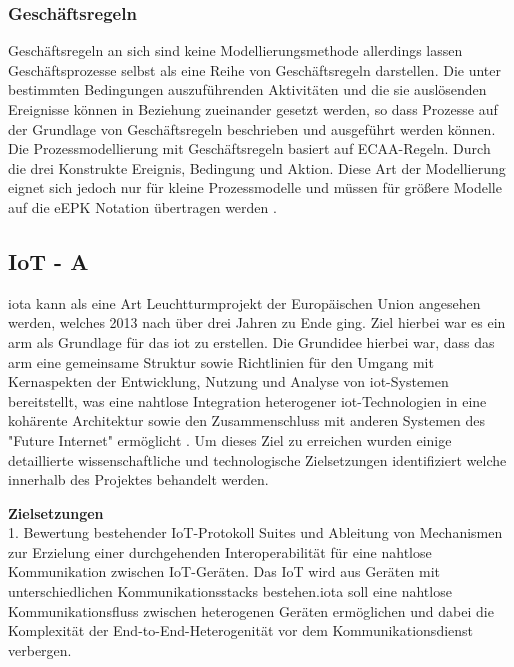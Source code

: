 \documentclass[a4paper, 12pt, twoside, headsepline=true]{scrartcl} %
\begin{document}
\subsubsection{Geschäftsregeln}

Geschäftsregeln an sich sind keine Modellierungsmethode allerdings lassen Geschäftsprozesse selbst als eine Reihe von Geschäftsregeln darstellen. Die unter bestimmten Bedingungen auszuführenden Aktivitäten und die sie auslösenden Ereignisse können in Beziehung zueinander gesetzt werden, so dass Prozesse auf der Grundlage von Geschäftsregeln beschrieben und ausgeführt werden können. Die Prozessmodellierung mit Geschäftsregeln basiert auf ECAA-Regeln. Durch die drei Konstrukte Ereignis, Bedingung und Aktion. Diese Art der Modellierung eignet sich jedoch nur für kleine Prozessmodelle und müssen für größere Modelle auf die \ac{eEPK} Notation übertragen werden \cite{businessrules}.

\subsection{IoT - A}

\acl{iota} kann als eine Art Leuchtturmprojekt der Europäischen Union angesehen werden, welches 2013 nach über drei Jahren zu Ende ging. Ziel hierbei war es ein \ac{arm} als Grundlage für das \ac{iot} zu erstellen. Die Grundidee hierbei war, dass das \ac{arm} eine gemeinsame Struktur sowie Richtlinien für den Umgang mit Kernaspekten der Entwicklung, Nutzung und Analyse von \ac{iot}-Systemen bereitstellt, was eine nahtlose Integration heterogener \ac{iot}-Technologien in eine kohärente Architektur sowie den Zusammenschluss mit anderen Systemen des "Future Internet" ermöglicht \cite[S.17]{enablingthingstotalk}. Um dieses Ziel zu erreichen wurden einige detaillierte wissenschaftliche und technologische Zielsetzungen identifiziert welche innerhalb des Projektes behandelt werden\cite{meetiot}.
\newline

\textbf{Zielsetzungen}
\\

1. Bewertung bestehender IoT-Protokoll Suites und Ableitung von Mechanismen zur Erzielung einer durchgehenden Interoperabilität für eine nahtlose Kommunikation zwischen IoT-Geräten. Das IoT wird aus Geräten mit unterschiedlichen Kommunikationsstacks bestehen.\ac{iota} soll eine nahtlose Kommunikationsfluss zwischen heterogenen Geräten ermöglichen und dabei die Komplexität der End-to-End-Heterogenität vor dem Kommunikationsdienst verbergen.
\\
\end{document}
